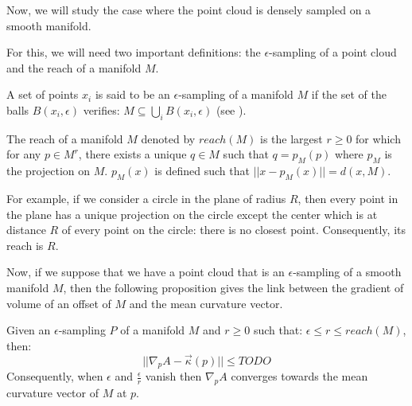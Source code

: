 Now, we will study the case where the point cloud is densely sampled on a smooth
manifold.

For this, we will need two important definitions: the $\epsilon$-sampling of a
point cloud and the reach of a manifold $ M $.

\begin{definition}
    A set of points $ x_i $ is said to be an $\epsilon$-sampling of a manifold $
    M $ if the set of the balls  $ B(x_i, \epsilon) $ verifies: $ M \subseteq
    \bigcup_i B(x_i, \epsilon) $ (see \cite{amenta1999surface}).
\end{definition}

\begin{definition}
    The reach of a manifold $ M $ denoted by $ reach(M) $ is the largest $ r
    \geq 0 $ for which for any $ p \in M^r $, there exists a unique $ q \in M $
    such that $ q = p_M(p) $ where $ p_M $ is the projection on $ M $. $ p_M(x)
    $ is defined such that $ || x - p_M(x) || = d(x, M) $.
\end{definition}

For example, if we consider a circle in the plane of radius $ R $, then every
point in the plane has a unique projection on the circle except the center which
is at distance $ R $ of every point on the circle: there is no closest point.
Consequently, its reach is $ R $.

Now, if we suppose that we have a point cloud that is an $\epsilon$-sampling of
a smooth manifold $ M $, then the following proposition gives the link between
the gradient of volume of an offset of $ M $ and the mean curvature vector.

\begin{proposition}
    Given an $\epsilon$-sampling $ P $ of a manifold $ M $ and $ r \ge 0 $ such
    that: $ \epsilon \leq r \leq reach(M) $, then:
    $$ || \nabla_p A - \vec{\kappa}(p) || \leq TODO $$
    Consequently, when $ \epsilon $ and $ \frac{\epsilon}{r} $ vanish then
    $ \nabla_p A $ converges towards the mean curvature vector of $ M $ at $ p
    $.
\end{proposition}

